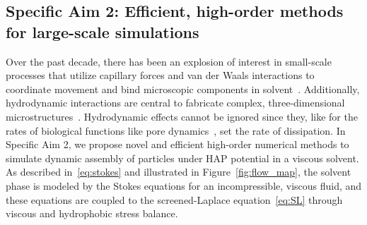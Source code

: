 \subsection{Specific Aim 2: Efficient, high-order methods for
large-scale simulations}
Over the past decade, there has been an explosion of interest in
small-scale processes that utilize capillary forces and van der Waals
interactions to coordinate movement and bind microscopic components in
solvent~\cite{Pandey2011, Zhang2017, Siontorou2017}. Additionally,
hydrodynamic interactions are central to fabricate complex,
three-dimensional microstructures~\cite{Dasgupta2017, Leong2007,
Reynolds2019, Cho2010}. Hydrodynamic effects cannot be ignored since
they, like for the rates of biological functions like pore
dynamics~\cite{RYHAM20112929}, set the rate of dissipation. In Specific
Aim 2, we propose novel and efficient high-order numerical methods to
simulate dynamic assembly of particles under HAP potential in a viscous
solvent. As described in~\eqref{eq:stokes} and illustrated in
Figure~\ref{fig:flow_map}, the solvent phase is modeled by the Stokes
equations for an incompressible, viscous fluid, and these equations are
coupled to the screened-Laplace equation~\eqref{eq:SL} through viscous
and hydrophobic stress balance. 
 
